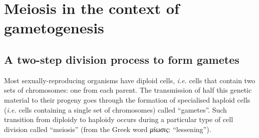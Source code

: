 %
%
%
%
%
%
%










\section{Meiosis in the context of gametogenesis}

\subsection{A two-step division process to form gametes}

Most sexually-reproducing organisms have diploid cells, \textit{i.e.} cells that contain two sets of chromosomes: one from each parent.
The transmission of half this genetic material to their progeny goes through the formation of specialised haploid cells (\textit{i.e.} cells containing a single set of chromosomes) called “gametes”.
Such transition from diploidy to haploidy occurs during a particular type of cell division called “meiosis” (from the Greek word \textit{\textgreek{μ}\textepsilon\textgreek{ίωσις}}: “lessening”).

